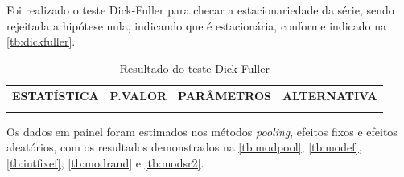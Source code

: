 \documentclass[
  12pt,
  12pt,
  openright,
  oneside,
  a4paper,
  chapter=TITLE,
  section=TITLE,
  subsection=TITLE,
  subsubsection=TITLE,
  english,
  portugues,
  sumario=tradicional]{abntex2}
\begin{document}
Foi realizado o teste Dick-Fuller para checar a estacionariedade da série, sendo rejeitada a hipótese nula, indicando que é estacionária, conforme indicado na \autoref{tb:dickfuller}.

\begin{table}[!hb]
\caption{Resultado do teste Dick-Fuller}
\vspace{1mm}
\begingroup\fontsize{10}{12}\selectfont

\begin{tabu} to 
\toprule
ESTATÍSTICA & P.VALOR & PARÂMETROS & ALTERNATIVA\\
\midrule
{} &  &  & \\
\bottomrule
\end{tabu}
\endgroup{}
\vspace{1mm}
\label{tb:dickfuller}
\vspace{-2mm}
\end{table}

Os dados em painel foram estimados nos métodos \emph{pooling}, efeitos fixos e efeitos aleatórios, com os resultados demonstrados na \autoref{tb:modpool}, \autoref{tb:modef}, \autoref{tb:intfixef}, \autoref{tb:modrand} e \autoref{tb:modsr2}.
\end{document}
